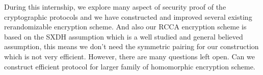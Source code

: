 During this internship, we explore many aspect of security proof of the cryptographic protocols
and we have constructed and improved several existing rerandomizable encryption scheme.
And also our RCCA encryption scheme is based on the SXDH assumption which is a well studied and general believed assumption,
this means we don't need the symmetric pairing for our construction which is not very efficient.
However, there are many questions left open. Can we construct efficient protocol for larger family of homomorphic encryption scheme.
